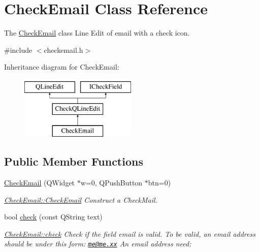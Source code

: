 \hypertarget{classCheckEmail}{\section{Check\-Email Class Reference}
\label{classCheckEmail}
}


The \hyperlink{classCheckEmail}{Check\-Email} class Line Edit of email with a check icon.  




{\ttfamily \#include $<$checkemail.\-h$>$}

Inheritance diagram for Check\-Email\-:\begin{figure}[H]
\begin{center}
\leavevmode
\includegraphics[height=3.000000cm]{da/d1d/classCheckEmail}
\end{center}
\end{figure}
\subsection*{Public Member Functions}
\begin{DoxyCompactItemize}
\item 
\hyperlink{classCheckEmail_a385bd05063deaf42fc02918b9348c8ac}{Check\-Email} (Q\-Widget $\ast$w=0, Q\-Push\-Button $\ast$btn=0)
\begin{DoxyCompactList}\small\item\em \hyperlink{classCheckEmail_a385bd05063deaf42fc02918b9348c8ac}{Check\-Email\-::\-Check\-Email} Construct a Check\-Mail. \end{DoxyCompactList}\item 
bool \hyperlink{classCheckEmail_a544d7656d36bd463391fe2f4dd3e13c6}{check} (const Q\-String text)
\begin{DoxyCompactList}\small\item\em \hyperlink{classCheckEmail_a544d7656d36bd463391fe2f4dd3e13c6}{Check\-Email\-::check} Check if the field email is valid. To be valid, an email address should be under this form\-: \href{mailto:me@me.xx}{\tt me@me.\-xx} An email address need\-: \end{DoxyCompactList}\end{DoxyCompactItemize}
